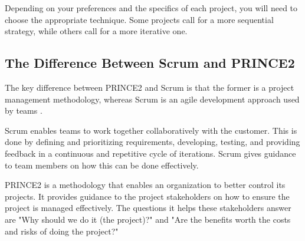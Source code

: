 \documentclass{article}
\begin{document}
Depending on your preferences and the specifics of each project, you will need to choose the appropriate technique. Some projects call for a more sequential strategy, while others call for a more iterative one.

\subsection{The Difference Between Scrum and PRINCE2}
The key difference between PRINCE2 and Scrum is that the former is a project management methodology, whereas Scrum is an agile development approach used by teams \cite{diffscrum}.

Scrum enables teams to work together collaboratively with the customer. This is done by defining and prioritizing requirements, developing, testing, and providing feedback in a continuous and repetitive cycle of iterations. Scrum gives guidance to team members on how this can be done effectively.

PRINCE2 is a methodology that enables an organization to better control its projects. It provides guidance to the project stakeholders on how to ensure the project is managed effectively. The questions it helps these stakeholders answer are "Why should we do it (the project)?" and "Are the benefits worth the costs and risks of doing the project?"


\end{document}
